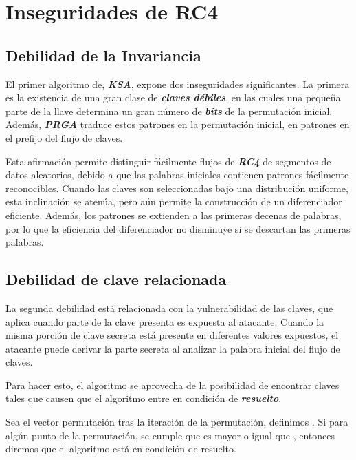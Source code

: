 \documentclass[
]{article}
\begin{document}
\hypertarget{inseguridades-de-rc4}{%
\section{Inseguridades de RC4}\label{inseguridades-de-rc4}}

\hypertarget{debilidad-de-la-invariancia}{%
\subsection{Debilidad de la
Invariancia}\label{debilidad-de-la-invariancia}}

El primer algoritmo de, \textbf{\emph{KSA}}, expone dos inseguridades
significantes. La primera es la existencia de una gran clase de
\textbf{\emph{claves débiles}}, en las cuales una pequeña parte de la
llave determina un gran número de \textbf{\emph{bits}} de la permutación
inicial. Además, \textbf{\emph{PRGA}} traduce estos patrones en la
permutación inicial, en patrones en el prefijo del flujo de claves.

Esta afirmación permite distinguir fácilmente flujos de
\textbf{\emph{RC4}} de segmentos de datos aleatorios, debido a que las
palabras iniciales contienen patrones fácilmente reconocibles. Cuando
las claves son seleccionadas bajo una distribución uniforme, esta
inclinación se atenúa, pero aún permite la construcción de un
diferenciador eficiente. Además, los patrones se extienden a las
primeras decenas de palabras, por lo que la eficiencia del diferenciador
no disminuye si se descartan las primeras palabras.

\hypertarget{debilidad-de-clave-relacionada}{%
\subsection{Debilidad de clave
relacionada}\label{debilidad-de-clave-relacionada}}

La segunda debilidad está relacionada con la vulnerabilidad de las
claves, que aplica cuando parte de la clave presenta es expuesta al
atacante. Cuando la misma porción de clave secreta está presente en
diferentes valores expuestos, el atacante puede derivar la parte secreta
al analizar la palabra inicial del flujo de claves.

Para hacer esto, el algoritmo se aprovecha de la posibilidad de
encontrar claves tales que causen que el algoritmo entre en condición de
\textbf{\emph{resuelto}}.

Sea {} el vector permutación tras la iteración {} de la permutación,
definimos {}. Si para algún punto de la permutación, se cumple que {} es
mayor o igual que {}, entonces diremos que el algoritmo está en
condición de resuelto.
\end{document}
